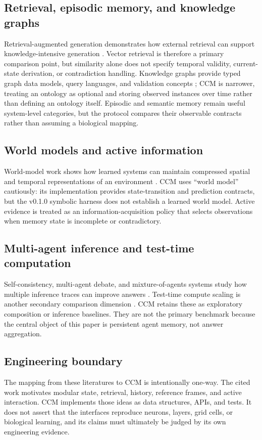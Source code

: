 \subsection{Retrieval, episodic memory, and knowledge graphs}

Retrieval-augmented generation demonstrates how external retrieval can support knowledge-intensive generation \citep{lewis2020rag}. Vector retrieval is therefore a primary comparison point, but similarity alone does not specify temporal validity, current-state derivation, or contradiction handling. Knowledge graphs provide typed graph data models, query languages, and validation concepts \citep{hogan2021knowledgegraphs}; CCM is narrower, treating an ontology as optional and storing observed instances over time rather than defining an ontology itself. Episodic and semantic memory remain useful system-level categories, but the protocol compares their observable contracts rather than assuming a biological mapping.

\subsection{World models and active information}

World-model work shows how learned systems can maintain compressed spatial and temporal representations of an environment \citep{ha2018worldmodels}. CCM uses ``world model'' cautiously: its implementation provides state-transition and prediction contracts, but the v0.1.0 symbolic harness does not establish a learned world model. Active evidence is treated as an information-acquisition policy that selects observations when memory state is incomplete or contradictory.

\subsection{Multi-agent inference and test-time computation}

Self-consistency, multi-agent debate, and mixture-of-agents systems study how multiple inference traces can improve answers \citep{wang2022selfconsistency,du2023debate,wang2024moa}. Test-time compute scaling is another secondary comparison dimension \citep{snell2024scaling}. CCM retains these as exploratory composition or inference baselines. They are not the primary benchmark because the central object of this paper is persistent agent memory, not answer aggregation.

\subsection{Engineering boundary}

The mapping from these literatures to CCM is intentionally one-way. The cited work motivates modular state, retrieval, history, reference frames, and active interaction. CCM implements those ideas as data structures, APIs, and tests. It does not assert that the interfaces reproduce neurons, layers, grid cells, or biological learning, and its claims must ultimately be judged by its own engineering evidence.
